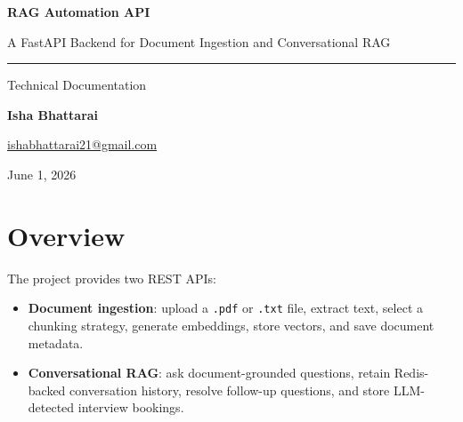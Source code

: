 \documentclass[12pt, a4paper]{article}
\begin{document}
\begin{titlepage}
    \centering
    \vspace*{3cm}

    {\Huge\bfseries\color{primary}RAG Automation API\par}
    \vspace{0.6cm}
    {\Large\color{accent}A FastAPI Backend for Document Ingestion and Conversational RAG\par}
    \vspace{1.5cm}
    \rule{0.7\linewidth}{0.5pt}\par
    \vspace{1cm}
    {\large Technical Documentation\par}
    \vspace{2cm}

    {\large\textbf{Isha Bhattarai}\par}
    \vspace{0.3cm}
    {\normalsize\href{mailto:ishabhattarai21@gmail.com}{ishabhattarai21@gmail.com}\par}

    \vfill
    {\normalsize June 1, 2026\par}
\end{titlepage}

\begin{abstract}
RAG Automation API is a modular FastAPI backend for document ingestion and
retrieval-augmented generation. It accepts PDF and TXT documents, extracts and
chunks their text using a selectable strategy, generates Gemini embeddings, and
stores vectors in Qdrant. The conversational API retrieves relevant context
without using \texttt{RetrievalQAChain}, preserves multi-turn chat history in
Redis, and uses an LLM to detect and persist interview bookings in PostgreSQL.
\end{abstract}

\tableofcontents
\newpage

\section{Overview}

The project provides two REST APIs:

\begin{itemize}[leftmargin=1.5em]
    \item \textbf{Document ingestion}: upload a \texttt{.pdf} or \texttt{.txt}
    file, extract text, select a chunking strategy, generate embeddings, store
    vectors, and save document metadata.
    \item \textbf{Conversational RAG}: ask document-grounded questions, retain
    Redis-backed conversation history, resolve follow-up questions, and store
    LLM-detected interview bookings.
\end{itemize}
\end{document}
